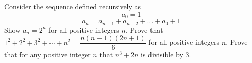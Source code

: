 \documentclass[11pt]{exam}
\theoremstyle{definition}
\newcommand{\class}{MATH2710}
\newcommand{\examnum}{Practice Worksheet 2}
\newcommand{\examdate}{9/30/16}
\begin{document}
 

\pagestyle{head}


%
%
%
%
%
%
%


\begin{questions}
\question Consider the sequence defined recursively as 
\[a_0=1\]
\[a_n=a_{n-1}+a_{n-2}+\ldots +a_0+1\]
Show $a_n=2^n$ for all positive integers $n$. 
\newpage
\question 
Prove that $1^2+2^2+3^2+\cdots +n^2=\dfrac{n(n+1)(2n+1)}{6}$ for all positive integers $n$. 
\newpage
\question Prove that for any positive integer $n$ that $n^3+2n$ is divisible by 3. 
\end{questions}
\end{document}
